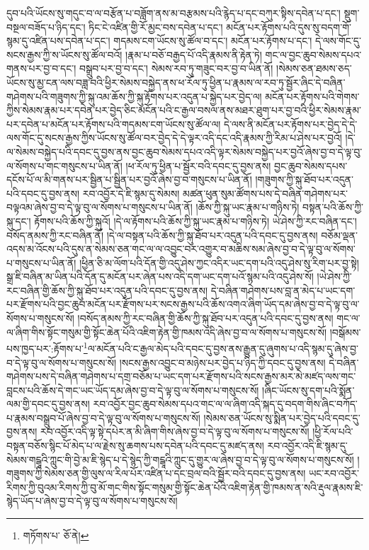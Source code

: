 དུབ་པའི་ཡོངས་སུ་གདུང་བ་ལ་བརྩོན་པ་བཟློག་ནས་མ་བརྩམས་པའི་རྙེད་པ་དང་བཀུར་སྟིས་དབེན་པ་དང་། སྡུག་བསྔལ་བཟོད་པ་ཉིད་དང་། ཏིང་ངེ་འཛིན་གྱི་རོ་མྱང་བས་དབེན་པ་དང་། མངོན་པར་རྟོགས་པའི་དུས་སུ་བདག་གོ་སྙམ་དུ་འཛིན་པས་དབེན་པ་དང་། གདམས་ངག་ཡོངས་སུ་ཚོལ་བ་དང་། མངོན་པར་རྟོགས་པ་དང་། དེ་ལས་གོང་དུ་སངས་རྒྱས་ཀྱི་ས་ཡོངས་སུ་ཚོལ་བའོ། །རྣམ་པ་བཅོ་བརྒྱད་པོ་འདི་རྣམས་ནི་རྟེན་ཏེ། གང་ལ་བྱང་ཆུབ་སེམས་དཔའ་གནས་པར་བྱ་བ་དང་། བསྒྲུབ་པར་བྱ་བ་དང་། སེམས་རབ་ཏུ་གཟུང་བར་བྱ་བ་ཡིན་ནོ། །སེམས་ཅན་ཐམས་ཅད་ཡོངས་སུ་མྱ་ངན་ལས་བཟླ་བའི་ཕྱིར་སེམས་བསྐྱེད་ནས་ཕ་རོལ་ཏུ་ཕྱིན་པ་རྣམས་ལ་རབ་ཏུ་སྦྱོར་ཞིང་དེ་བཞིན་གཤེགས་པའི་གཟུགས་ཀྱི་སྐུ་འམ་ཆོས་ཀྱི་སྐུ་རྟོགས་པར་འདུན་པ་སྐྱེད་པར་བྱེད་ལ། མངོན་པར་རྟོགས་པའི་གེགས་ཀྱིས་སེམས་རྣམ་པར་དབེན་པར་བྱེད་ཅིང་མངོན་པའི་ང་རྒྱལ་བསལ་ནས་མཐར་ཐུག་པར་བྱ་བའི་ཕྱིར་སེམས་རྣམ་པར་དབེན་པ་མངོན་པར་རྟོགས་པའི་གདམས་ངག་ཡོངས་སུ་ཚོལ་ལ། དེ་ལས་ནི་མངོན་པར་རྟོགས་པར་བྱེད་དེ་དེ་ལས་གོང་དུ་སངས་རྒྱས་ཀྱིས་ཡོངས་སུ་ཚོལ་བར་བྱེད་དེ་དེ་ལྟར་འདི་དང་འདི་རྣམས་ཀྱི་རིམ་པ་ཤེས་པར་བྱའོ། །དེ་ལ་སེམས་བསྐྱེད་པའི་དབང་དུ་བྱས་ནས་བྱང་ཆུབ་སེམས་དཔའ་འདི་ལྟར་སེམས་བསྐྱེད་པར་བྱའོ་ཞེས་བྱ་བ་དེ་ལྟ་བུ་ལ་སོགས་པ་གང་གསུངས་པ་ཡིན་ནོ། །ཕ་རོལ་ཏུ་ཕྱིན་པ་སྦྱོར་བའི་དབང་དུ་བྱས་ནས། བྱང་ཆུབ་སེམས་དཔས་དངོས་པོ་ལ་མི་གནས་པར་སྦྱིན་པ་སྦྱིན་པར་བྱའོ་ཞེས་བྱ་བ་གསུངས་པ་ཡིན་ནོ། །གཟུགས་ཀྱི་སྐུ་ཐོབ་པར་འདུན་པའི་དབང་དུ་བྱས་ནས། རབ་འབྱོར་དེ་ཇི་སྙམ་དུ་སེམས། མཚན་ཕུན་སུམ་ཚོགས་པས་དེ་བཞིན་གཤེགས་པར་བལྟའམ་ཞེས་བྱ་བ་དེ་ལྟ་བུ་ལ་སོགས་པ་གསུངས་པ་ཡིན་ནོ། །ཆོས་ཀྱི་སྐུ་ཡང་རྣམ་པ་གཉིས་ཏེ། བསྟན་པའི་ཆོས་ཀྱི་སྐུ་དང་། རྟོགས་པའི་ཆོས་ཀྱི་སྐུའོ། །དེ་ལ་རྟོགས་པའི་ཆོས་ཀྱི་སྐུ་ཡང་རྣམ་པ་གཉིས་ཏེ། ཡེ་ཤེས་ཀྱི་རང་བཞིན་དང་། བསོད་ནམས་ཀྱི་རང་བཞིན་ནོ། །དེ་ལ་བསྟན་པའི་ཆོས་ཀྱི་སྐུ་ཐོབ་པར་འདུན་པའི་དབང་དུ་བྱས་ནས། བཅོམ་ལྡན་འདས་མ་འོངས་པའི་དུས་ན་སེམས་ཅན་གང་ལ་ལ་འབྱུང་བར་འགྱུར་བ་མཆིས་སམ་ཞེས་བྱ་བ་དེ་ལྟ་བུ་ལ་སོགས་པ་གསུངས་པ་ཡིན་ནོ། །ཕྱིན་ཅི་མ་ལོག་པའི་དོན་གྱི་འདུ་ཤེས་ཀྱང་འདིར་ཡང་དག་པའི་འདུ་ཤེས་སུ་རིག་པར་བྱ་སྟེ། སྒྲ་ཇི་བཞིན་མ་ཡིན་པའི་དོན་དུ་མངོན་པར་ཞེན་པས་འདི་དག་ཡང་དག་པའོ་སྙམ་པའི་འདུ་ཤེས་སོ། །ཡེ་ཤེས་ཀྱི་རང་བཞིན་གྱི་ཆོས་ཀྱི་སྐུ་ཐོབ་པར་འདུན་པའི་དབང་དུ་བྱས་ནས། དེ་བཞིན་གཤེགས་པས་བླ་ན་མེད་པ་ཡང་དག་པར་རྫོགས་པའི་བྱང་ཆུབ་མངོན་པར་རྫོགས་པར་སངས་རྒྱས་པའི་ཆོས་འགའ་ཞིག་ཡོད་དམ་ཞེས་བྱ་བ་དེ་ལྟ་བུ་ལ་སོགས་པ་གསུངས་སོ། །བསོད་ནམས་ཀྱི་རང་བཞིན་གྱི་ཆོས་ཀྱི་སྐུ་ཐོབ་པར་འདུན་པའི་དབང་དུ་བྱས་ནས། གང་ལ་ལ་ཞིག་གིས་སྟོང་གསུམ་གྱི་སྟོང་ཆེན་པོའི་འཇིག་རྟེན་གྱི་ཁམས་འདི་ཞེས་བྱ་བ་ལ་སོགས་པ་གསུངས་སོ། །བསྒོམས་པས་ཁྱད་པར་:རྟོགས་པ་\footnote{གཏོགས་པ་  ཅོ་ནེ། }ལ་མངོན་པའི་ང་རྒྱལ་མེད་པའི་དབང་དུ་བྱས་ནས་རྒྱུན་དུ་ཞུགས་པ་འདི་སྙམ་དུ་ཞེས་བྱ་བ་དེ་ལྟ་བུ་ལ་སོགས་པ་གསུངས་སོ། །སངས་རྒྱས་འབྱུང་བ་མཉེས་པར་བྱེད་པ་ཉིད་ཀྱི་དབང་དུ་བྱས་ནས། དེ་བཞིན་གཤེགས་པས་དེ་བཞིན་གཤེགས་པ་དགྲ་བཅོམ་པ་ཡང་དག་པར་རྫོགས་པའི་སངས་རྒྱས་མར་མེ་མཛད་ལས་གང་བླངས་པའི་ཆོས་དེ་གང་ཡང་ཡོད་དམ་ཞེས་བྱ་བ་དེ་ལྟ་བུ་ལ་སོགས་པ་གསུངས་སོ། །ཞིང་ཡོངས་སུ་དག་པའི་སྨོན་ལམ་གྱི་དབང་དུ་བྱས་ནས། རབ་འབྱོར་བྱང་ཆུབ་སེམས་དཔའ་གང་ལ་ལ་ཞིག་འདི་སྐད་དུ་བདག་གིས་ཞིང་བཀོད་པ་རྣམས་བསྒྲུབ་པོ་ཞེས་བྱ་བ་དེ་ལྟ་བུ་ལ་སོགས་པ་གསུངས་སོ། །སེམས་ཅན་ཡོངས་སུ་སྨིན་པར་བྱེད་པའི་དབང་དུ་བྱས་ནས། རབ་འབྱོར་འདི་ལྟ་སྟེ་དཔེར་ན་མི་ཞིག་གིས་ཞེས་བྱ་བ་དེ་ལྟ་བུ་ལ་སོགས་པ་གསུངས་སོ། །ཕྱི་རོལ་པའི་བསྟན་བཅོས་སྙིང་པོ་མེད་པ་ལ་རྗེས་སུ་ཆགས་པས་དབེན་པའི་དབང་དུ་མཛད་ནས། རབ་འབྱོར་འདི་ཇི་སྙམ་དུ་སེམས་གངྒཱའི་ཀླུང་གི་བྱེ་མ་ཇི་སྙེད་པ་དེ་སྙེད་ཀྱི་གངྒཱའི་ཀླུང་དུ་གྱུར་ལ་ཞེས་བྱ་བ་དེ་ལྟ་བུ་ལ་སོགས་པ་གསུངས་སོ། །གཟུགས་ཀྱི་སེམས་ཅན་གྱི་ལུས་ལ་རིལ་པོར་འཛིན་པ་དང་བྲལ་བའི་སྦྱོར་བའི་དབང་དུ་བྱས་ནས། ཡང་རབ་འབྱོར་རིགས་ཀྱི་བུའམ་རིགས་ཀྱི་བུ་མོ་གང་གིས་སྟོང་གསུམ་གྱི་སྟོང་ཆེན་པོའི་འཇིག་རྟེན་གྱི་ཁམས་ན་སའི་རྡུལ་རྣམས་ཇི་སྙེད་ཡོད་པ་ཞེས་བྱ་བ་དེ་ལྟ་བུ་ལ་སོགས་པ་གསུངས་སོ། 